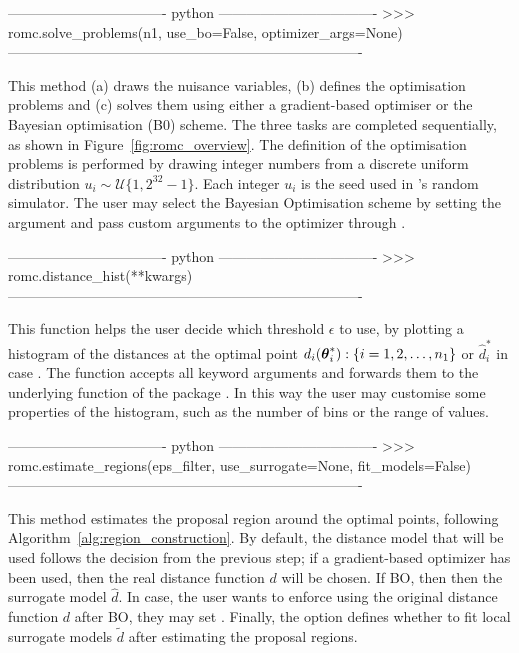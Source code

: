 \begin{Code}
---------------------------------- python ----------------------------------
>>> romc.solve_problems(n1, use_bo=False, optimizer_args=None)
----------------------------------------------------------------------------
\end{Code}

\noindent
This method (a) draws the nuisance variables, (b) defines the
optimisation problems and (c) solves them using either a
gradient-based optimiser or the Bayesian optimisation (B0) scheme. The
three tasks are completed sequentially, as shown in
Figure~\ref{fig:romc_overview}. The definition of the optimisation
problems is performed by drawing  integer numbers from a
discrete uniform distribution \(u_i \sim \mathcal{U}\{1,
2^{32}-1\}\). Each integer \(u_i\) is the seed used in 's
random simulator. The user may select the Bayesian Optimisation scheme
by setting the argument  and pass custom arguments
to the optimizer through .

\begin{Code}
---------------------------------- python ----------------------------------
>>> romc.distance_hist(**kwargs)
----------------------------------------------------------------------------
\end{Code}

\noindent
This function helps the user decide which threshold \(\epsilon\) to
use, by plotting a histogram of the distances at the optimal point
\(d_i(\boldsymbol{\theta}_i^*) : \{i = 1, 2, \ldots, n_1\}\) or \(\hat{d}_i^*\) in
case . The function accepts all keyword arguments
and forwards them to the underlying  function of
the package . In this way the user may customise some
properties of the histogram, such as the number of bins or the range
of values.

\begin{Code}
---------------------------------- python ----------------------------------
>>> romc.estimate_regions(eps_filter, use_surrogate=None, fit_models=False)
----------------------------------------------------------------------------
\end{Code}

\noindent
This method estimates the proposal region around the optimal points,
following Algorithm~\ref{alg:region_construction}. By default, the
distance model that will be used follows the decision from the
previous step; if a gradient-based optimizer has been used, then the
real distance function \(d\) will be chosen. If BO, then then the
surrogate model \(\hat{d}\). In case, the user wants to enforce using
the original distance function \(d\) after BO, they may set
. Finally, the option 
defines whether to fit local surrogate models \(\tilde{d}\) after
estimating the proposal regions.


